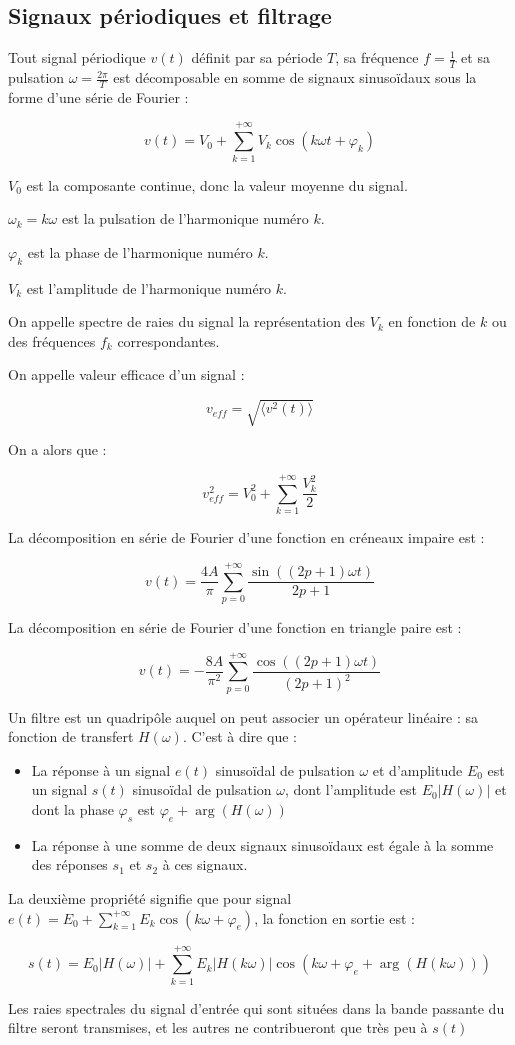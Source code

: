 \documentclass[a4paper,12pt]{book}
\newcommand{\Def}[2]{\begin{tcolorbox}[colback=white,colframe=red!10!green!20!blue!75!, title=Définition : #1]#2\end{tcolorbox}}
\newcommand{\Thr}[2]{\begin{tcolorbox}[sharp corners, colback=white,colframe=red!10!blue!30!green!75!, title=Théorème : #1]#2\end{tcolorbox}}
\begin{document}
\subsection{Signaux périodiques et filtrage}
\Thr{}{Tout signal périodique $v(t)$ définit par sa période $T$, sa fréquence $f=\frac{1}{T}$ et sa pulsation $\omega = \frac{2\pi}{T}$ est décomposable en somme de signaux sinusoïdaux sous la forme d'une série de Fourier :
\par $$v(t) = V_0+\sum\limits_{k=1}^{+\infty}V_k\cos(k\omega t+\varphi_k)$$
\par $V_0$ est la composante continue, donc la valeur moyenne du signal.
\par $\omega_k=k\omega$ est la pulsation de l'harmonique numéro $k$.
\par $\varphi_k$ est la phase de l'harmonique numéro $k$.
\par $V_k$ est l'amplitude de l'harmonique numéro $k$.
\par On appelle spectre de raies du signal la représentation des $V_k$ en fonction de $k$ ou des fréquences $f_k$ correspondantes.
\par On appelle valeur efficace d'un signal :
\par $$v_{eff} = \sqrt{\langle v^2(t)\rangle}$$
\par On a alors que :
\par $$v_{eff}^2 = V_0^2 +\sum\limits_{k=1}^{+\infty}\frac{V_k^2}{2}$$}
\Def{Exemples classiques}{La décomposition en série de Fourier d'une fonction en créneaux impaire est :
\par $$v(t) =\frac{4A}{\pi}\sum\limits_{p=0}^{+\infty}\frac{\sin((2p+1)\omega t)}{2p+1}$$
\par La décomposition en série de Fourier d'une fonction en triangle paire est :
\par $$v(t) = -\frac{8A}{\pi^2}\sum\limits_{p=0}^{+\infty}\frac{\cos((2p+1)\omega t)}{(2p+1)^2}$$}
\Def{Filtre}{Un filtre est un quadripôle auquel on peut associer un opérateur linéaire : sa fonction de transfert $H(\omega)$. C'est à dire que :\begin{itemize}
\item La réponse à un signal $e(t)$ sinusoïdal de pulsation $\omega$ et d'amplitude $E_0$ est un signal $s(t)$ sinusoïdal de pulsation $\omega$, dont l'amplitude est $E_0\vert H(\omega)\vert$ et dont la phase $\varphi_s$ est $\varphi_e +\arg(H(\omega))$
\item La réponse à une somme de deux signaux sinusoïdaux est égale à la somme des réponses $s_1$ et $s_2$ à ces signaux.
\end{itemize}
La deuxième propriété signifie que pour signal $e(t) = E_0+\sum\limits_{k=1}^{+\infty}E_k\cos(k\omega+\varphi_e)$, la fonction en sortie est :
\par $$s(t) =E_0\vert H(\omega)\vert + \sum\limits_{k=1}^{+\infty}E_k\vert H(k\omega)\vert\cos(k\omega+\varphi_e+\arg(H(k\omega)))$$
\par Les raies spectrales du signal d'entrée qui sont situées dans la bande passante du filtre seront transmises, et les autres ne contribueront que très peu à $s(t)$}
\end{document}

